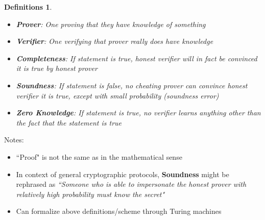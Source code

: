 \documentclass{beamer}
\newtheorem{defns}[prop]{Definitions}
\begin{document}
\begin{frame}
\begin{small}

\begin{defns}
\begin{itemize}
\item \textbf{Prover}: One proving that they have knowledge of something
\item \textbf{Verifier}: One verifying that prover really does have knowledge
\item \textbf{Completeness}: If statement is true, honest verifier will in fact be convinced it is true by honest prover
\item \textbf{Soundness}: If statement is false, no cheating prover can convince honest verifier it is true, except with small probability (soundness error)
\item \textbf{Zero Knowledge}: If statement is true, no verifier learns anything other than the fact that the statement is true
\end{itemize}
\end{defns}

\vspace{3mm}
\pause
Notes:

\begin{itemize}
\item ``Proof" is not the same as in the mathematical sense
\pause
\item In context of general cryptographic protocols, \textbf{Soundness} might be rephrased as \emph{``Someone who is able to impersonate the honest prover with relatively high probability must know the secret"}
\pause
\item Can formalize above definitions/scheme through Turing machines
\end{itemize}

\end{small}
\end{frame}
\end{document}
